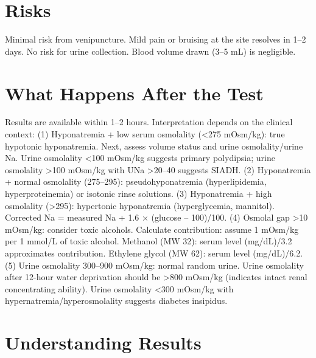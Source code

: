\section*{Risks}
Minimal risk from venipuncture. Mild pain or bruising at the site resolves in 1--2 days. No risk for urine collection. Blood volume drawn (3--5 mL) is negligible.

\section*{What Happens After the Test}
Results are available within 1--2 hours. Interpretation depends on the clinical context: (1) Hyponatremia + low serum osmolality (<275 mOsm/kg): true hypotonic hyponatremia. Next, assess volume status and urine osmolality/urine Na. Urine osmolality <100 mOsm/kg suggests primary polydipsia; urine osmolality >100 mOsm/kg with UNa >20--40 suggests SIADH. (2) Hyponatremia + normal osmolality (275--295): pseudohyponatremia (hyperlipidemia, hyperproteinemia) or isotonic rinse solutions. (3) Hyponatremia + high osmolality (>295): hypertonic hyponatremia (hyperglycemia, mannitol). Corrected Na = measured Na + 1.6 $\times$ (glucose -- 100)/100. (4) Osmolal gap >10 mOsm/kg: consider toxic alcohols. Calculate contribution: assume 1 mOsm/kg per 1 mmol/L of toxic alcohol. Methanol (MW 32): serum level (mg/dL)/3.2 approximates contribution. Ethylene glycol (MW 62): serum level (mg/dL)/6.2. (5) Urine osmolality 300--900 mOsm/kg: normal random urine. Urine osmolality after 12-hour water deprivation should be >800 mOsm/kg (indicates intact renal concentrating ability). Urine osmolality <300 mOsm/kg with hypernatremia/hyperosmolality suggests diabetes insipidus.

\section*{Understanding Results}

